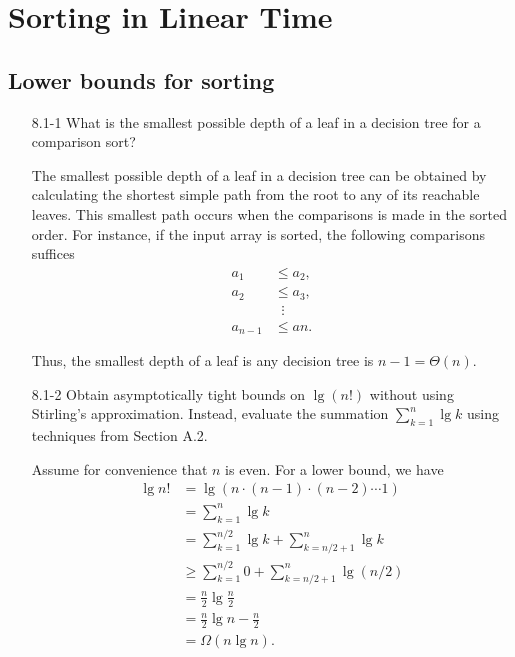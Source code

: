 \chapter{Sorting in Linear Time}

\section{Lower bounds for sorting}

\begin{enumerate}

\item[8.1{-}1]{What is the smallest possible depth of a leaf in a decision tree
for a comparison sort?}

\begin{framed}
The smallest possible depth of a leaf in a decision tree
can be obtained by calculating the shortest simple path from the root to any
of its reachable leaves. This smallest path occurs when the comparisons is made
in the sorted order. For instance, if the input array is sorted, the following
comparisons suffices
\begin{equation*}
\begin{aligned}
  a_1 &\le a_2,\\
  a_2 &\le a_3,\\
  &\;\;\vdots\\
  a_{n - 1} &\le a{n}.
\end{aligned}
\end{equation*}

Thus, the smallest depth of a leaf is any decision tree is $n - 1 = \Theta(n)$.

\end{framed}

\item[8.1{-}2]{Obtain asymptotically tight bounds on $\lg(n!)$ without using
Stirling's approximation. Instead, evaluate the summation $\sum_{k = 1}^n \lg k$
using techniques from Section A.2.}

\begin{framed}
Assume for convenience that $n$ is even. For a lower bound, we have
\begin{equation*}
\begin{aligned}
  \lg{n!} &=   \lg(n \cdot (n - 1) \cdot (n - 2) \cdots 1)\\
          &=   \sum_{k = 1}^{n} \lg k\\
          &=   \sum_{k = 1}^{n/2} \lg k + \sum_{k = n/2 + 1}^{n} \lg k\\
          &\ge \sum_{k = 1}^{n/2} 0 + \sum_{k = n/2 + 1}^{n} \lg (n/2)\\
          &=   \frac{n}{2} \lg{\frac{n}{2}}\\
          &=   \frac{n}{2} \lg n - \frac{n}{2}\\
          &=   \Omega(n \lg n).
\end{aligned}
\end{equation*}


\end{framed}
\end{enumerate}
